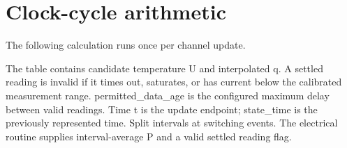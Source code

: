 \documentclass[11pt,letterpaper]{article}
\begin{document}
\appendix
{}
\section{Clock-cycle arithmetic}

The following calculation runs once per channel update.

The table contains candidate temperature \textsf{U} and interpolated \textsf{q}. A settled reading is invalid if it times out, saturates, or has current below the calibrated measurement range. \textsf{permitted\_\allowbreak{}data\_\allowbreak{}age} is the configured maximum delay between valid readings. Time \textsf{t} is the update endpoint; \textsf{state\_\allowbreak{}time} is the previously represented time. Split intervals at switching events. The electrical routine supplies interval-average \textsf{P} and a valid settled reading flag.
\end{document}
